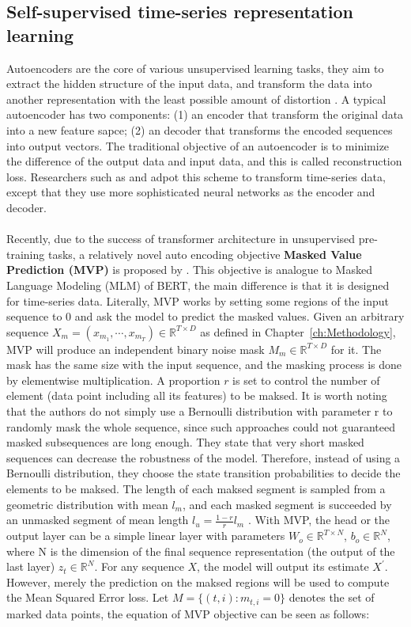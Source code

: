 \subsection{Self-supervised time-series representation learning}
Autoencoders are the core of various unsupervised learning tasks, they aim to extract the hidden structure of the input data, and transform the data into another representation with the least possible amount of distortion \cite{baldi2012autoencoders}. A typical autoencoder has two components: (1) an encoder that transform the original data into a new feature sapce; (2) an decoder that transforms the encoded sequences into output vectors. The traditional objective of an autoencoder is to minimize the difference of the output data and input data, and this is called reconstruction loss. Researchers such as \cite{malhotra2017timenet} and \cite{bianchi2019learning} adpot this scheme to transform time-series data, except that they use more sophisticated neural networks as the encoder and decoder. \\
\\Recently, due to the success of transformer architecture in unsupervised pre-training tasks, a relatively novel auto encoding objective \textbf{Masked Value Prediction (MVP)} is proposed by \cite{zerveas2020transformer}. This objective is analogue to Masked Language Modeling (MLM) of BERT, the main difference is that it is designed for time-series data. Literally, MVP works by setting some regions of the input sequence to 0 and ask the model to predict the masked values. Given an arbitrary sequence $X_m = (x_{m_1},\cdots, x_{m_T}) \in \mathbb{R}^{T \times D}$ as defined in Chapter~\ref{ch:Methodology}, MVP will produce an independent binary noise mask $M_m \in \mathbb{R}^{T \times D}$ for it. The mask has the same size with the input sequence, and the masking process is done by elementwise multiplication. A proportion $r$ is set to control the number of element (data point including all its features) to be maksed. It is worth noting that the authors do not simply use a Bernoulli distribution with parameter r to randomly mask the whole sequence, since such approaches could not guaranteed masked subsequences are long enough. They state that very short masked sequences can decrease the robustness of the model. Therefore, instead of using a Bernoulli distribution, they choose the state transition probabilities to decide the elements to be maksed. The length of each maksed segment is sampled from a geometric distribution with mean $l_m$, and each masked segment is succeeded by an unmasked segment of mean length $l_u=\frac{1-r}{r} l_m$ \cite{zerveas2020transformer}. With MVP, the head or the output layer can be a simple linear layer with parameters $W_o \in \mathbb{R}^{T \times N}$, $b_o \in \mathbb{R}^{N} $, where N is the dimension of the final sequence representation (the output of the last layer) $z_t \in \mathbb{R}^{N}$. For any sequence $X$, the model will output its estimate $X^\prime$. However, merely the prediction on the maksed regions will be used to compute the Mean Squared Error loss. Let $M = \{ (t,i): m_{t,i} = 0\}$ denotes the set of marked data points, the equation of MVP objective can be seen as follows:
